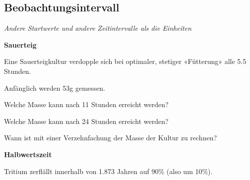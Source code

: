 
\subsection{Beobachtungsintervall}
\textit{Andere Startwerte und andere Zeitintervalle als die Einheiten}



\bbwActAufgabenNr{} \textbf{Sauerteig}

Eine Sauerteigkultur verdopple sich bei optimaler, stetiger «Fütterung» alle 5.5 Stunden.

Anfänglich werden 53g gemessen.

\begin{bbwAufgabenBlock}

\item Welche Masse kann nach 11 Stunden erreicht werden?

\item Welche Masse kann nach 24 Stunden erreicht werden?

\item Wann ist mit einer Verzehnfachung der Masse der Kultur zu rechnen?


\end{bbwAufgabenBlock}
\platzFuerBerechnungenBisEndeSeite{}



\bbwActAufgabenNr{} \textbf{Halbwertszeit}

Tritium zerflällt innerhalb von 1.873 Jahren auf 90\%  (also um 10\%).


